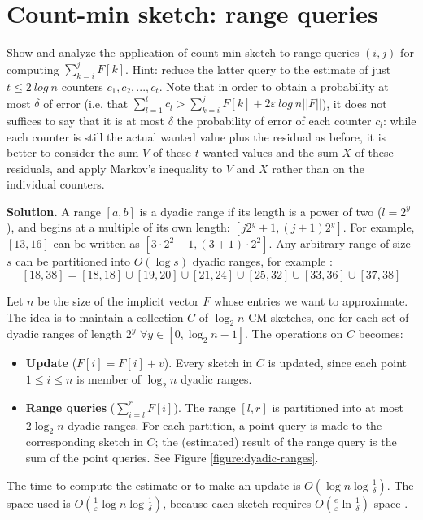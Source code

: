 \section{Count-min sketch: range queries}

Show and analyze the application of count-min sketch to range queries $(i,j)$ for computing  $\sum^j_{k=i} F[k]$. Hint: reduce the latter query to the estimate of just $t \leq 2\ log\ n$ counters $c_1,c_2,...,c_t$. Note that in order to obtain a probability at most $\delta$ of error (i.e. that $\sum^t_{l=1}c_l > \sum^j_{k=i}F[k] + 2\varepsilon\ log\ n ||F||$), it does not suffices to say that it is at most $\delta$ the probability of error of each counter $c_l$: while each counter is still the actual wanted value plus the residual as before, it is better to consider the sum $V$ of these $t$ wanted values and the sum $X$ of these residuals, and apply Markov’s inequality to $V$ and $X$ rather than on the individual counters.

\vspace{1cm}
\noindent
\textbf{Solution.} A range $[a,b]$ is a dyadic range if its length is a power of two ($l=2^y$), and begins at a multiple of its own length: $[j2^y+1, (j+1)2^y]$. For example, $[13,16]$ can be written as $[3\cdot 2^2+1,(3+1)\cdot 2^2]$. Any arbitrary range of size $s$ can be partitioned into $O(\log s)$ dyadic ranges, for example \cite{Cormode11}:
$$[18,38]=[18,18]\cup[19,20]\cup[21,24]\cup[25,32]\cup[33,36]\cup[37,38]$$

Let $n$ be the size of the implicit vector $F$ whose entries we want to approximate. The idea is to maintain a collection $C$ of $\log_2 n$ CM sketches, one for each set of dyadic ranges of length $2^y$ $\forall y\in [0, \log_2 n-1]$. The operations on $C$ becomes:
\begin{itemize}
  \item \textbf{Update} ($F[i] = F[i] + v$). Every sketch in $C$ is updated, since each point $1 \leq i \leq n$ is member of $\log_2 n$ dyadic ranges.
  \item \textbf{Range queries} ($\sum_{i=l}^rF[i]$). The range $[l,r]$ is partitioned into at most $2\log_2 n$ dyadic ranges. For each partition, a point query is made to the corresponding sketch in $C$; the (estimated) result of the range query is the sum of the point queries. See Figure \ref{figure:dyadic-ranges}.
\end{itemize}

The time to compute the estimate or to make an update is $O(\log n\log\frac{1}{\delta})$. The space used is $O(\frac{1}{\varepsilon}\log n\log\frac{1}{\delta})$, because each sketch requires $O(\frac{e}{\varepsilon}\ln\frac{1}{\delta})$ space \cite{Cormode05}.

